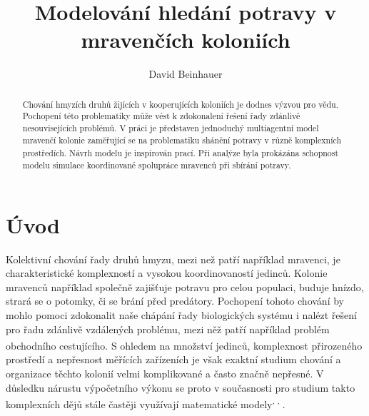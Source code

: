 \documentclass[10pt,a4paper,twocolumn]{article}
\begin{document}
\providecommand{\ShortAuthorList}[0]{David Beinhauer}
\title{Modelování hledání potravy v mravenčích koloniích}
\author[1,*]{David Beinhauer}

\date{\dateline{}}

\begin{abstract}
\noindent
Chování hmyzích druhů žijících v kooperujících koloniích je dodnes 
výzvou pro vědu. Pochopení této problematiky může vést k zdokonalení řešení
řady zdánlivě nesouvisejících problémů. V práci je představen jednoduchý
multiagentní model mravenčí kolonie zaměřující se na problematiku shánění
potravy v různě komplexních prostředích. Návrh modelu je inspirován 
prací\textsuperscript{\cite{jones2010characteristics}}. 
Při analýze byla prokázána schopnost modelu simulace koordinované 
spolupráce mravenců při sbírání potravy.


\DOI{} %
\end{abstract}

\maketitle
\thispagestyle{titlestyle}



\section{Úvod}

Kolektivní chování řady druhů hmyzu, mezi než patří například mravenci,
je charakteristické komplexností a vysokou koordinovaností jedinců. Kolonie
mravenců například společně zajišťuje potravu pro celou populaci, buduje hnízdo,
strará se o potomky, či se brání před predátory. Pochopení tohoto chování by
mohlo pomoci zdokonalit naše chápání řady biologických systému i nalézt
řešení pro řadu zdánlivě vzdálených problému, mezi něž
patří například problém obchodního 
cestujícího\textsuperscript{\cite{applegate2011traveling}}. 
S ohledem na množství jedinců, komplexnost přirozeného prostředí a 
nepřesnost měřících zařízeních je však exaktní studium chování a 
organizace těchto kolonií velmi komplikované a 
často značně nepřesné. V důsledku nárustu výpočetního výkonu se proto v 
současnosti pro studium takto komplexních dějů stále častěji 
využívají matematické modely\textsuperscript{\cite{drogoul1994multi}, 
\cite{xiang2008ant}, \cite{ilie2013multi}}. 
\end{document}
